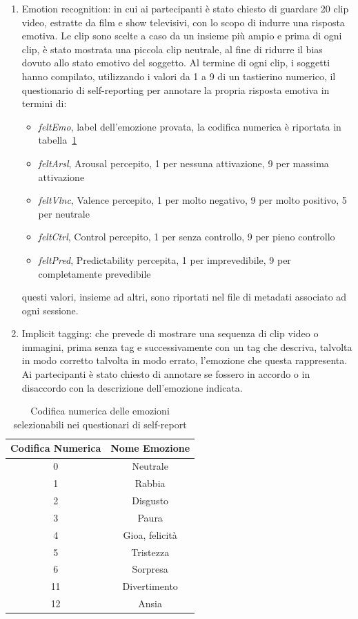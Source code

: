 \begin{enumerate}
    \item Emotion recognition: in cui ai partecipanti è stato chiesto di guardare 20 clip video, estratte da film e show televisivi, con lo scopo di indurre una risposta emotiva. Le clip sono scelte a caso da un insieme più ampio e prima di ogni clip, è stato mostrata una piccola clip neutrale, al fine di ridurre il bias dovuto allo stato emotivo del soggetto.
    Al termine di ogni clip, i soggetti hanno compilato, utilizzando i valori da 1 a 9 di un tastierino numerico, il questionario di self-reporting per annotare la propria risposta emotiva in termini di:
    \begin{itemize}
        \item \emph{feltEmo}, label dell'emozione provata, la codifica numerica è riportata in tabella~\ref{tab:emotions_map}
        \item \emph{feltArsl}, Arousal percepito, 1 per nessuna attivazione, 9 per massima attivazione
        \item \emph{feltVlnc}, Valence percepito, 1 per molto negativo, 9 per molto positivo, 5 per neutrale
        \item \emph{feltCtrl}, Control percepito, 1 per senza controllo, 9 per pieno controllo
        \item \emph{feltPred}, Predictability percepita, 1 per imprevedibile, 9 per completamente prevedibile
    \end{itemize}
    questi valori, insieme ad altri, sono riportati nel file di metadati associato ad ogni sessione.

    \item Implicit tagging: che prevede di mostrare una sequenza di clip video o immagini, prima senza tag e successivamente con un tag che descriva, talvolta in modo corretto talvolta in modo errato, l'emozione che questa rappresenta. Ai partecipanti è stato chiesto di annotare se fossero in accordo o in disaccordo con la descrizione dell'emozione indicata.
\end{enumerate}

\begin{table}[]
\begin{tabular}{c|c}
Codifica Numerica & Nome Emozione \\
\hline
0                 & Neutrale \\
1                 & Rabbia \\
2                 & Disgusto \\
3                 & Paura \\
4                 & Gioa, felicità \\
5                 & Tristezza \\
6                 & Sorpresa \\
11                & Divertimento \\
12                & Ansia \\
\end{tabular}
\caption{Codifica numerica delle emozioni selezionabili nei questionari di self-report}
\label{tab:emotions_map}
\end{table}

